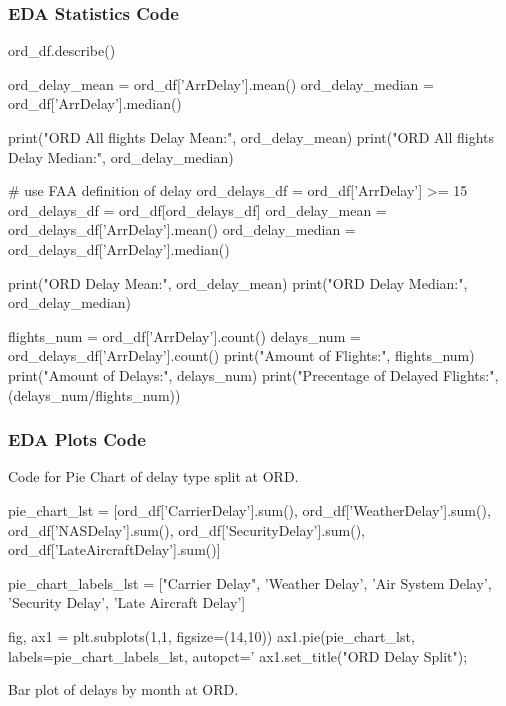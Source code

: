 \documentclass[a4paper,12pt]{article}
\begin{document}
\subsubsection{EDA Statistics Code} \label{EDA Statistics Code}

\begin{python}
ord_df.describe()

ord_delay_mean = ord_df['ArrDelay'].mean()
ord_delay_median = ord_df['ArrDelay'].median()

print("ORD All flights Delay Mean:", ord_delay_mean)
print("ORD All flights Delay Median:", ord_delay_median)

# use FAA definition of delay
ord_delays_df = ord_df['ArrDelay'] >= 15
ord_delays_df = ord_df[ord_delays_df]
ord_delay_mean = ord_delays_df['ArrDelay'].mean()
ord_delay_median = ord_delays_df['ArrDelay'].median()

print("ORD Delay Mean:", ord_delay_mean)
print("ORD Delay Median:", ord_delay_median)

flights_num = ord_df['ArrDelay'].count()
delays_num = ord_delays_df['ArrDelay'].count()
print("Amount of Flights:", flights_num)
print("Amount of Delays:", delays_num)
print("Precentage of Delayed Flights:", (delays_num/flights_num))

\end{python}

\subsubsection{EDA Plots Code}

Code for Pie Chart of delay type split at ORD.

\begin{python}
    
pie_chart_lst = [ord_df['CarrierDelay'].sum(), ord_df['WeatherDelay'].sum(),
 ord_df['NASDelay'].sum(), ord_df['SecurityDelay'].sum(), ord_df['LateAircraftDelay'].sum()]

pie_chart_labels_lst = ["Carrier Delay", 'Weather Delay', 'Air System Delay',
 'Security Delay', 'Late Aircraft Delay']

fig, ax1 = plt.subplots(1,1, figsize=(14,10))
ax1.pie(pie_chart_lst, labels=pie_chart_labels_lst, autopct='%
ax1.set_title("ORD Delay Split");

\end{python}

Bar plot of delays by month at ORD.
\end{document}
